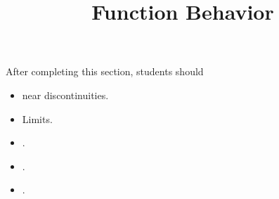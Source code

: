 \documentclass{ximera}
\title{Function Behavior}
\begin{document}
\begin{abstract}
\end{abstract}
\maketitle

\begin{sectionOutcomes}
After completing this section, students should 

\begin{itemize}
\item near discontinuities.
\item Limits.
\item .
\item .
\item .
\end{itemize}
\end{sectionOutcomes}
\end{document}
